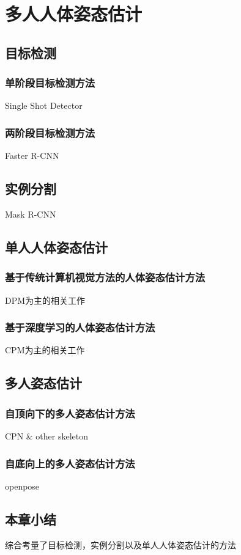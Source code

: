 \chapter{多人人体姿态估计}
\label{cha:related}

\section{目标检测}
\label{sec:detect}
\subsection{单阶段目标检测方法}
\label{subsec:1stagedetector}
Single Shot Detector
\subsection{两阶段目标检测方法}
\label{2stagedetector}
Faster R-CNN

\section{实例分割}
\label{sec:insseg}
Mask R-CNN

\section{单人人体姿态估计}
\label{sec:singlepose}
\subsection{基于传统计算机视觉方法的人体姿态估计方法}
\label{subsec:legacypose}
DPM为主的相关工作
\subsection{基于深度学习的人体姿态估计方法}
\label{subsec:deeppose}
CPM为主的相关工作

\section{多人姿态估计}
\label{sec:multipose}
\subsection{自顶向下的多人姿态估计方法}
\label{subsec:topdownpose}
CPN \& other skeleton
\subsection{自底向上的多人姿态估计方法}
\label{subsec:bottomuppose}
openpose

\section{本章小结}
综合考量了目标检测，实例分割以及单人人体姿态估计的方法

